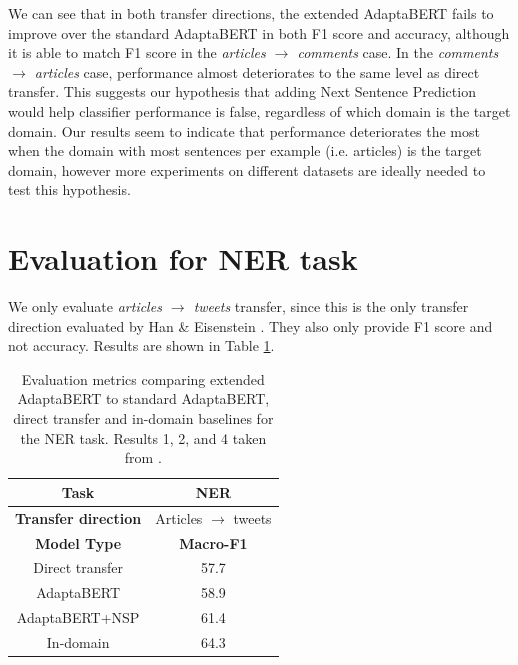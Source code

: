 We can see that in both transfer directions, the extended AdaptaBERT fails to improve over the standard AdaptaBERT in both F1 score and accuracy, although it is able to match F1 score in the \textit{articles $ \rightarrow $ comments} case. In the \textit{comments $ \rightarrow $ articles} case, performance almost deteriorates to the same level as direct transfer. This suggests our hypothesis that adding Next Sentence Prediction would help classifier performance is false, regardless of which domain is the target domain. Our results seem to indicate that performance deteriorates the most when the domain with most sentences per example (i.e. articles) is the target domain, however more experiments on different datasets are ideally needed to test this hypothesis.

\section{Evaluation for NER task} \label{sec:nsp-evaluation-ner}

We only evaluate \textit{articles $ \rightarrow $ tweets} transfer, since this is the only transfer direction evaluated by Han \& Eisenstein \cite{adaptabert}. They also only provide F1 score and not accuracy. Results are shown in Table \ref{tab:adaptabert-nsp-ner-results}.

\begin{table}[ht]
    \begin{center}
        \begin{tabular}{|c|c|}
            \hline
            \textbf{Task} & NER \\
            \hline
            \textbf{Transfer direction} & Articles $ \rightarrow $ tweets \\
            \hline \hline
            \textbf{Model Type} & \textbf{Macro-F1} \\
            \hline
            Direct transfer & 57.7  \\
            AdaptaBERT & 58.9  \\
            AdaptaBERT+NSP & 61.4  \\
            \hline
            In-domain & 64.3 \\
            \hline
        \end{tabular}
    \end{center}
    \caption{Evaluation metrics comparing extended AdaptaBERT to standard AdaptaBERT, direct transfer and in-domain baselines for the NER task. Results 1, 2, and 4 taken from \cite{adaptabert}.}
    \label{tab:adaptabert-nsp-ner-results}
\end{table}

